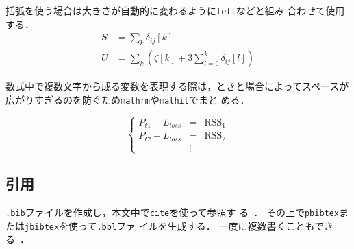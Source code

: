 括弧を使う場合は大きさが自動的に変わるように\texttt{\yen left}などと組み
合わせて使用する．
\begin{align*}
 S &= \sum_k \delta_{ij}[k] \\
 U &= \sum_k \left( \zeta[k] + 3\sum_{l=0}^k \delta_{ij}[l] \right)
\end{align*}

数式中で複数文字から成る変数を表現する際は，ときと場合によってスペースが
広がりすぎるのを防ぐため\texttt{\yen mathrm}や\texttt{\yen mathit}でまと
める．

\begin{equation*}
 \left\{
 \begin{array}{rcl}
  P_{t1} - L_\mathit{loss} &=& \mathrm{RSS}_1\\
  P_{t2} - L_\mathit{loss} &=& \mathrm{RSS}_2\\
  &\vdots&
 \end{array}
 \right.
\end{equation*}

\subsection{引用}

\texttt{.bib}ファイルを作成し，本文中で\texttt{\yen cite}を使って参照す
る~\cite{wu13:will_pds}．
その上で\texttt{pbibtex}または\texttt{jbibtex}を使って\texttt{.bbl}ファ
イルを生成する．
一度に複数書くこともでき
る~\cite{scholten08:cmc_psp,nakauchi05:intelli_kitchen%
,yang12:locate_finger}．


